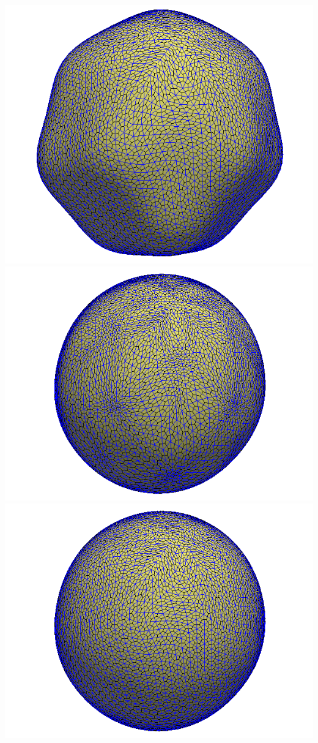 \documentclass[portrait,a0]{a0poster}
\begin{document}
\begin{multicols}{3}
\begin{center}
		\hspace{0.1\linewidth}
		\includegraphics[width=0.35\linewidth]{bumpy_omega100_level5_tstep50.png}
		\newline
		\includegraphics[width=0.35\linewidth]{bumpy_noRed_level5_tstep128.png}
		\hspace{0.1\linewidth}
		\includegraphics[width=0.35\linewidth]{bumpy_omega100_level5_tstep128.png}
		\newline
		\vspace{-20pt}
		\label{fig:bumpy_sphere} 
	\end{center}
	

\end{multicols}
\end{document}
